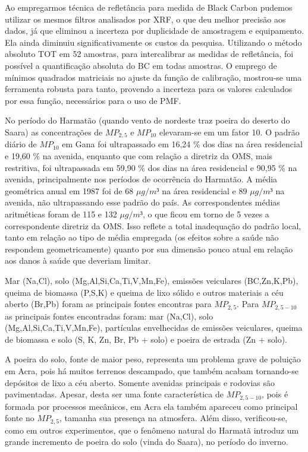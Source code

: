 Ao empregarmos técnica de refletância para medida de Black Carbon pudemos utilizar os mesmos filtros analisados por XRF, o que deu melhor precisão aos dados, já que eliminou a incerteza por duplicidade de amostragem e equipamento. Ela ainda diminuiu significativamente os custos da pesquisa. Utilizando o método absoluto TOT em 52 amostras, para intercalibrar as medidas de refletância, foi possível a quantificação absoluta do BC em todas amostras. O emprego de mínimos quadrados matriciais no ajuste da função de calibração, mostrou-se uma ferramenta robusta para tanto, provendo a incerteza para os valores calculados por essa função, necessários para o uso de PMF.

No período do Harmatão (quando vento de nordeste traz poeira do deserto do Saara) as concentrações de $MP_{2,5}$ e $MP_{10}$ elevaram-se em um fator 10. O padrão diário de $MP_{10}$ em Gana foi ultrapassado em 16,24 \% dos dias na área residencial e 19,60 \% na avenida, enquanto que com relação a diretriz da OMS, mais restritiva, foi ultrapassada em 59,90 \% dos dias na área residencial e 90,95 \% na avenida, principalmente nos períodos de ocorrência do Harmatão. A média geométrica anual em 1987 foi de 68 $\mu g/m³$ na área residencial e 89 $\mu g/m³$ na avenida, não ultrapassando esse padrão do país. As correspondentes médias aritméticas foram de 115 e 132 $\mu g/m³$, o que ficou em torno de 5 vezes a correspondente diretriz da OMS. Isso reflete a total inadequação do padrão local, tanto em relação ao tipo de média empregada (os efeitos sobre a saúde não respondem geometricamente) quanto por sua dimensão pouco atual em relação aos danos à saúde que deveriam limitar.

Mar (Na,Cl), solo (Mg,Al,Si,Ca,Ti,V,Mn,Fe), emissões veiculares (BC,Zn,K,Pb), queima de biomassa (P,S,K) e queima de lixo sólido e outros materiais a céu aberto (Br,Pb) foram as principais fontes encontras para $MP_{2,5}$. Para $MP_{2,5-10}$ as principais fontes encontradas foram: mar (Na,Cl), solo (Mg,Al,Si,Ca,Ti,V,Mn,Fe), partículas envelhecidas de emissões veiculares, queima de biomassa e solo (S, K, Zn, Br, Pb + solo) e poeira de estrada (Zn + solo).

A poeira do solo, fonte de maior peso, representa um problema grave de poluição em Acra, pois há muitos terrenos descampado, que também acabam tornando-se depósitos de lixo a céu aberto. Somente avenidas principais e rodovias são pavimentadas. Apesar, desta ser uma fonte característica de $MP_{2,5-10}$, pois é formada por processos mecânicos, em Acra ela também apareceu como principal fonte no $MP_{2,5}$, tamanha sua presença na atmosfera. Além disso, verificou-se, como em outros experimentos, que o fenômeno natural do Harmatã introduz um grande incremento de poeira do solo (vinda do Saara), no período do inverno.

